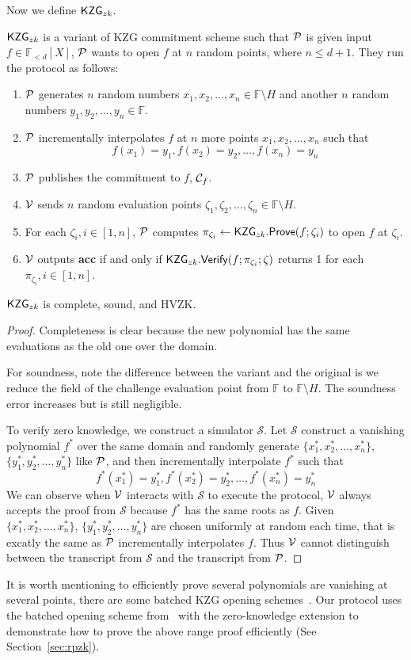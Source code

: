 Now we define $\kzgzk$.
\begin{definition}[$\kzgzk$]
$\kzgzk$ is a variant of KZG commitment scheme such that $\mathcal{P}$ is given input $f\in\mathbb{F}_{<d}[X]$, $\mathcal{P}$ wants to open $f$ at $n$ random points, where $n\le{d+1}$. They run the protocol as follows:
\begin{enumerate}
    \item $\mathcal{P}$ generates $n$ random numbers $x_1,x_2,\dots,x_n\in\mathbb{F}\setminus{H}$ and another $n$ random numbers $y_1,y_2,\dots,y_n\in\mathbb{F}$.
    \item $\mathcal{P}$ incrementally interpolates $f$ at $n$ more points $x_1,x_2,\dots,x_n$ such that
    \[ f(x_1)=y_1,f(x_2)=y_2,\dots,f(x_n)=y_n \]
    \item $\mathcal{P}$ publishes the commitment to $f$, $\mathcal{C}_f$.
    \item $\mathcal{V}$ sends $n$ random evaluation points $\zeta_1,\zeta_2,\dots,\zeta_n\in\mathbb{F}\setminus{H}$.
    \item For each $\zeta_i,i\in[1,n]$, $\mathcal{P}$ computes $\pi_{\zeta_i}\leftarrow\mathsf{KZG}_{zk}.\mathsf{Prove}(f;\zeta_i)$ to open $f$ at $\zeta_i$.
    \item $\mathcal{V}$ outputs \textbf{acc} if and only if $\mathsf{KZG}_{zk}.\mathsf{Verify}(f;\pi_{\zeta_i};\zeta)$ returns 1 for each $\pi_{\zeta_i},i\in[1,n]$.
\end{enumerate}
\end{definition}

\begin{theorem}
\label{thm:kzgzk}
$\kzgzk$ is complete, sound, and HVZK.
\end{theorem}
\begin{proof}
Completeness is clear because the new polynomial has the same evaluations as the old one over the domain.

For soundness, note the difference between the variant and the original is we reduce the field of the challenge evaluation point from $\mathbb{F}$ to $\mathbb{F}\setminus{H}$. The soundness error increases but is still negligible.

To verify zero knowledge, we construct a simulator $\mathcal{S}$. Let $\mathcal{S}$ construct a vanishing polynomial $f^*$ over the same domain and randomly generate $\{x_1^*,x_2^*,\dots,x_n^*\}$, $\{y_1^*,y_2^*,\dots,y_n^*\}$ like $\mathcal{P}$, and then incrementally interpolate $f^*$ such that
\[ f^*(x_1^*)=y_1^*,f^*(x_2^*)=y_2^*,\dots,f^*(x_n^*)=y_n^* \]
We can observe when $\mathcal{V}$ interacts with $\mathcal{S}$ to execute the protocol, $\mathcal{V}$ always accepts the proof from $\mathcal{S}$ because $f^*$ has the same roots as $f$. Given $\{x_1^*,x_2^*,\dots,x_n^*\}$, $\{y_1^*,y_2^*,\dots,y_n^*\}$ are chosen uniformly at random each time, that is excatly the same as $\mathcal{P}$ incrementally interpolates $f$. Thus $\mathcal{V}$ cannot distinguish between the transcript from $\mathcal{S}$ and the transcript from $\mathcal{P}$.
\end{proof}
It is worth mentioning to efficiently prove several polynomials are vanishing at several points, there are some batched KZG opening schemes~\cite{plonk,bdfg,fflonk}. Our protocol uses the batched opening scheme from~\cite{plonk} with the zero-knowledge extension to demonstrate how to prove the above range proof efficiently (See Section~\ref{sec:rpzk}).

